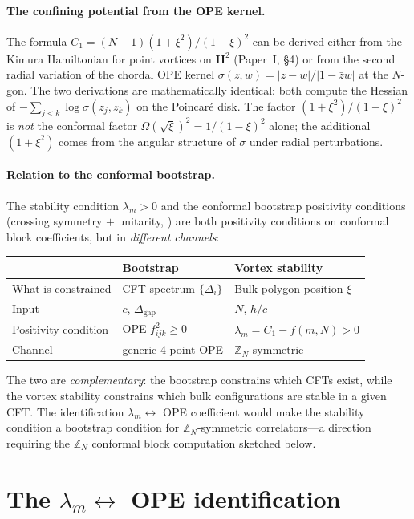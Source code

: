 \paragraph{The confining potential from the OPE kernel.}
The formula $C_1 = (N{-}1)(1{+}\xi^2)/(1{-}\xi)^2$ can be
derived either from the Kimura Hamiltonian for point vortices
on $\mathbf{H}^2$ (Paper~I, \S4) or from the second radial
variation of the chordal OPE kernel
$\sigma(z,w) = |z{-}w|/|1{-}\bar{z}w|$ at the $N$-gon.
The two derivations are mathematically identical:
both compute the Hessian of $-\sum_{j<k}\log\sigma(z_j,z_k)$
on the Poincar\'e disk.
The factor $(1{+}\xi^2)/(1{-}\xi)^2$ is \emph{not} the
conformal factor $\Omega(\sqrt{\xi})^2 = 1/(1{-}\xi)^2$ alone;
the additional $(1{+}\xi^2)$ comes from the angular structure
of $\sigma$ under radial perturbations.

\paragraph{Relation to the conformal bootstrap.}
The stability condition $\lambda_m > 0$ and the conformal
bootstrap positivity conditions (crossing symmetry $+$
unitarity, \citealt{Rattazzi2008}) are both positivity
conditions on conformal block coefficients, but in
\emph{different channels}:
\begin{center}
\begin{tabular}{lll}
\toprule
& Bootstrap & Vortex stability \\
\midrule
What is constrained &
  CFT spectrum $\{\Delta_i\}$ &
  Bulk polygon position $\xi$ \\
Input &
  $c$, $\Delta_{\mathrm{gap}}$ &
  $N$, $h/c$ \\
Positivity condition &
  OPE $f_{ijk}^2 \ge 0$ &
  $\lambda_m = C_1 - f(m,N) > 0$ \\
Channel &
  generic 4-point OPE &
  $\mathbb{Z}_N$-symmetric \\
\bottomrule
\end{tabular}
\end{center}
The two are \emph{complementary}: the bootstrap constrains
which CFTs exist, while the vortex stability constrains
which bulk configurations are stable in a given CFT.
The identification $\lambda_m \leftrightarrow$
OPE coefficient would make the stability condition a
bootstrap condition for $\mathbb{Z}_N$-symmetric
correlators---a direction requiring the $\mathbb{Z}_N$
conformal block computation sketched below.

\section{The $\lambda_m \leftrightarrow$ OPE identification}
\label{sec:ope-identification}

